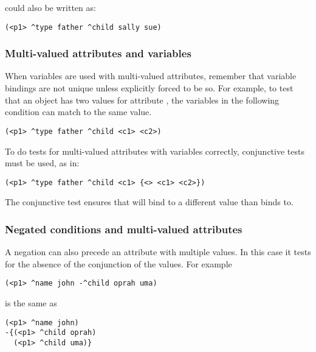 could also be written as:

\begin{verbatim}
(<p1> ^type father ^child sally sue)
\end{verbatim}


\subsubsection*{Multi-valued attributes and variables}

When variables are used with multi-valued attributes, remember that variable bindings are not unique unless explicitly forced to be so. For example, to test that an object has two values for attribute , the variables in the following condition can match to the same value.

\begin{verbatim}
(<p1> ^type father ^child <c1> <c2>)
\end{verbatim}
\vspace{12pt}

To do tests for multi-valued attributes with variables correctly, conjunctive tests must be used, as in:

\begin{verbatim}
(<p1> ^type father ^child <c1> {<> <c1> <c2>})
\end{verbatim}

The conjunctive test  ensures that  will bind to a different value than  binds to.


\subsubsection*{Negated conditions and multi-valued attributes}

A negation can also precede an attribute with multiple values.  In this case it tests for the absence of the conjunction of the values.  For example

\begin{verbatim}
(<p1> ^name john -^child oprah uma)
\end{verbatim}

is the same as

\begin{verbatim}
(<p1> ^name john)
-{(<p1> ^child oprah)
  (<p1> ^child uma)}
\end{verbatim}

